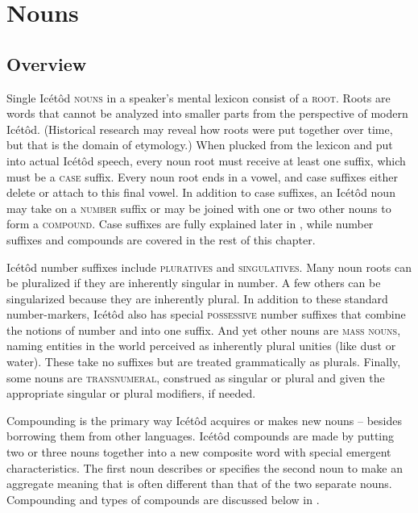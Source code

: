 \section{Nouns}\label{sec:4}



\subsection{Overview}\label{sec:4.1}


Single Icétôd \textsc{nouns} in a speaker’s mental lexicon consist of a \textsc{root.} Roots are words that cannot be analyzed into smaller parts from the perspective of modern Icétôd. (Historical research may reveal how roots were put together over time, but that is the domain of etymology.) When plucked from the lexicon and put into actual Icétôd speech, every noun root must receive at least one suffix, which must be a \textsc{case} suffix. Every noun root ends in a vowel, and case suffixes either delete or attach to this final vowel. In addition to case suffixes, an Icétôd noun may take on a \textsc{number} suffix or may be joined with one or two other nouns to form a \textsc{compound}. Case suffixes are fully explained later in , while number suffixes and compounds are covered in the rest of this chapter.

Icétôd number suffixes include \textsc{pluratives} and \textsc{singulatives}. Many noun roots can be pluralized if they are inherently singular in number. A few others can be singularized because they are inherently plural. In addition to these standard number-markers, Icétôd also has special \textsc{possessive} number suffixes that combine the notions of number and  into one suffix. And yet other nouns are \textsc{mass} \textsc{nouns}, naming entities in the world perceived as inherently plural unities (like dust or water). These take no suffixes but are treated grammatically as plurals. Finally, some nouns are \textsc{transnumeral}, construed as singular or plural and given the appropriate singular or plural modifiers, if needed. 

Compounding is the primary way Icétôd acquires or makes new nouns – besides borrowing them from other languages. Icétôd compounds are made by putting two or three nouns together into a new composite word with special emergent characteristics. The first noun describes or specifies the second noun to make an aggregate meaning that is often different than that of the two separate nouns. Compounding and types of compounds are discussed below in .

